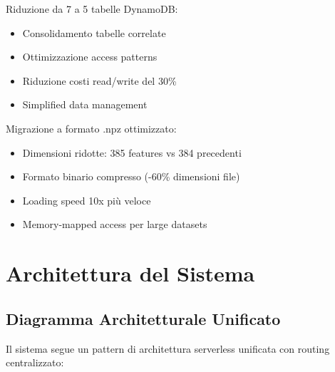 \documentclass[11pt,a4paper]{article}
\begin{document}
\begin{description}[style=nextline, leftmargin=0cm, itemsep=0.5em]
  \item[Database Schema Optimization] Riduzione da 7 a 5 tabelle DynamoDB:
    \begin{itemize}
      \item Consolidamento tabelle correlate
      \item Ottimizzazione access patterns
      \item Riduzione costi read/write del 30\%
      \item Simplified data management
    \end{itemize}
  
  \item[Enhanced Embedding Format] Migrazione a formato .npz ottimizzato:
    \begin{itemize}
      \item Dimensioni ridotte: 385 features vs 384 precedenti
      \item Formato binario compresso (-60\% dimensioni file)
      \item Loading speed 10x più veloce
      \item Memory-mapped access per large datasets
    \end{itemize}
\end{description}

\section{Architettura del Sistema}

\subsection{Diagramma Architetturale Unificato}
Il sistema segue un pattern di architettura serverless unificata con routing centralizzato:
\end{document}
